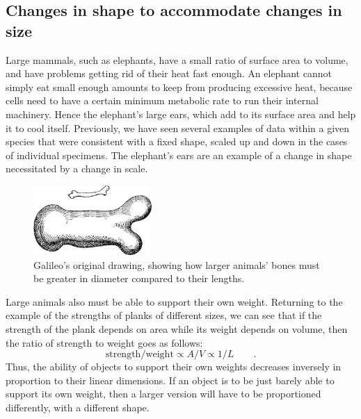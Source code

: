 \subsection{Changes in shape to accommodate changes in size}


Large mammals, such as elephants, have a
small ratio of surface area to volume, and have problems
getting rid of their heat fast enough. An elephant cannot
simply eat small enough amounts to keep from producing
excessive heat, because cells need to have a certain minimum
metabolic rate to run their internal machinery. Hence the
elephant's large ears, which add to its surface area and
help it to cool itself. Previously, we have seen several
examples of data within a given species that were consistent
with a fixed shape, scaled up and down in the cases of
individual specimens. The elephant's ears are an example of
a change in shape necessitated by a change in scale.

\begin{figure}[h] 
\begin{center}
\includegraphics[width=0.4\textwidth]{./scaling/figs/galileo-bones}
\caption{ \qquad  Galileo's original drawing, showing
 how larger animals' bones must be
 greater in diameter compared to their
 lengths.
 }
\end{center}
\end{figure}


\vspace{1.5mm}
Large animals also must be able to support their own weight.
Returning to the example of the strengths of planks of
different sizes, we can see that if the strength of the
plank depends on area while its weight depends on volume,
then the ratio of strength to weight goes as follows:
\begin{equation*}
 \text{strength}/\text{weight} \propto A/V \propto 1/L \qquad .
\end{equation*}
Thus, the ability of objects to support their own weights
decreases inversely in proportion to their linear dimensions.
If an object is to be just barely able to support its own
weight, then a larger version will have to be proportioned
differently, with a different shape.

